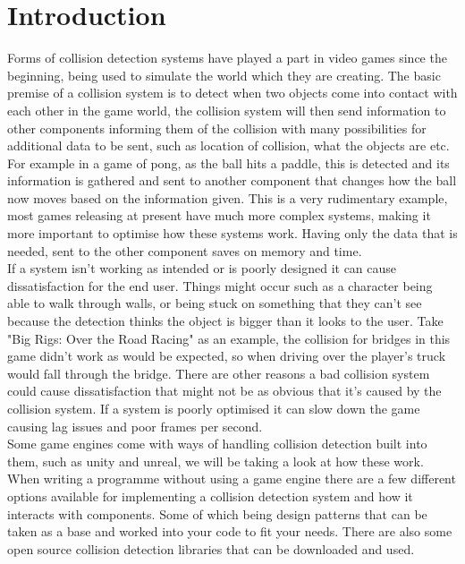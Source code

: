 \documentclass{scrartcl}
\begin{document}
	\section{Introduction}
	Forms of collision detection systems have played a part in video games since the beginning, being used to simulate the world which they are creating. The basic premise of a collision system is to detect when two objects come into contact with each other in the game world, the collision system will then send information to other components informing them of the collision with many possibilities for additional data to be sent, such as location of collision, what the objects are etc. For example in a game of pong, as the ball hits a paddle, this is detected and its information is gathered and sent to another component that changes how the ball now moves based on the information given. This is a very rudimentary example, most games releasing at present have much more complex systems, making it more important to optimise how these systems work. Having only the data that is needed, sent to the other component saves on memory and time.\\
	If a system isn't working as intended or is poorly designed it can cause dissatisfaction for the end user. Things might occur such as a character being able to walk through walls, or being stuck on something that they can't see because the detection thinks the object is bigger than it looks to the user. Take "Big Rigs: Over the Road Racing"\cite{bigrigs} as an example, the collision for bridges in this game didn't work as would be expected, so when driving over the player's truck would fall through the bridge. There are other reasons a bad collision system could cause dissatisfaction that might not be as obvious that it's caused by the collision system. If a system is poorly optimised it can slow down the game causing lag issues and poor frames per second.\\
	Some game engines come with ways of handling collision detection built into them, such as unity and unreal\cite{dickson2017experience}, we will be taking a look at how these work. When writing a programme without using a game engine there are a few different options available for implementing a collision detection system and how it interacts with components. Some of which being design patterns that can be taken as a base and worked into your code to fit your needs\cite{designpatternsandrefactoring_2018}. There are also some open source collision detection libraries that can be downloaded and used\cite{jslee02/awesome-collision-detection_2018}. 
	
\end{document}
